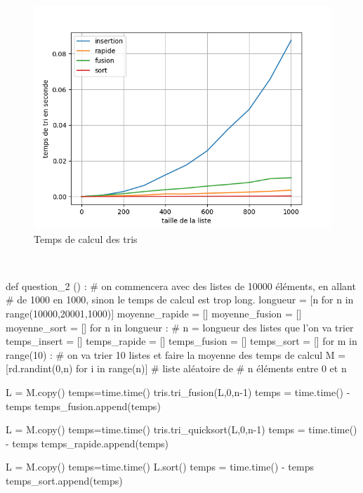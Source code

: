 \begin{corrige}
\begin{figure}[H]
\begin{center}
\includegraphics[scale=0.8]{programmes/question_1.png}
\caption{Temps de calcul des tris}
\end{center}
\end{figure}

\question\

\begin{python}
def question_2 () :
    # on commencera avec des listes de 10000 éléments, en allant
    # de 1000 en 1000, sinon le temps de calcul est trop long.
    longueur = [n for n in range(10000,20001,1000)]
    moyenne_rapide = []
    moyenne_fusion = []
    moyenne_sort = []
    for n in longueur :
        # n = longueur des listes que l'on va trier
        temps_insert = []
        temps_rapide = []
        temps_fusion = []
        temps_sort = []
        for m in range(10) :
            # on va trier 10 listes et faire la moyenne des temps de calcul
            M = [rd.randint(0,n) for i in range(n)] # liste aléatoire de
                        # n éléments entre 0 et n
                        

            L = M.copy()
            temps=time.time()
            tris.tri_fusion(L,0,n-1)
            temps = time.time() - temps
            temps_fusion.append(temps)
            
            L = M.copy()
            temps=time.time()
            tris.tri_quicksort(L,0,n-1)
            temps = time.time() - temps
            temps_rapide.append(temps)
            
            L = M.copy()
            temps=time.time()
            L.sort()
            temps = time.time() - temps
            temps_sort.append(temps)
            


\end{python}
\end{corrige}
